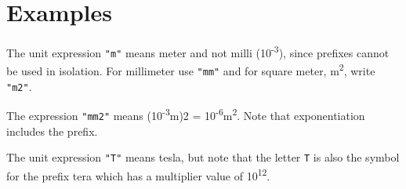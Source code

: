 \section{Examples}

The unit expression \lstinline!"m"! means meter and not milli
(10\textsuperscript{-3}), since prefixes cannot be used in isolation.
For millimeter use \lstinline!"mm"! and for square meter, m\textsuperscript{2}, write
\lstinline!"m2"!.

The expression \lstinline!"mm2"! means (10\textsuperscript{-3}m)2 =
10\textsuperscript{-6}m\textsuperscript{2}. Note that exponentiation
includes the prefix.

The unit expression \lstinline!"T"! means tesla, but note that the letter \lstinline!T! is
also the symbol for the prefix tera which has a multiplier value of
10\textsuperscript{12}.
